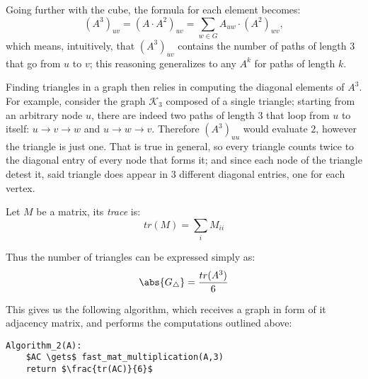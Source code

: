 Going further with the cube, the formula for each element becomes:
\[
    (A^3)_{uv} = \left( A \cdot A^2 \right)_{uv} = \sum_{w \in G} A_{uw} \cdot (A^2)_{wv},
\]
which means, intuitively, that $(A^3)_{uv}$ contains the number of paths of length $3$ that go from $u$ to $v$; this reasoning generalizes to any $A^k$ for paths of length $k$.

Finding triangles in a graph then relies in computing the diagonal elements of $A^3$. For example, consider the graph $\mathcal{K}_3$ composed of a single triangle; starting from an arbitrary node $u$, there are indeed two paths of length $3$ that loop from $u$ to itself: $u \to v \to w$ and $u \to w \to v$. Therefore $(A^3)_{uu}$ would evaluate $2$, however the triangle is just one. That is true in general, so every triangle counts twice to the diagonal entry of every node that forms it; and since each node of the triangle detest it, said triangle does appear in $3$ different diagonal entries, one for each vertex.

\begin{definition}
    Let $M$ be a matrix, its \emph{trace} is:
    \begin{equation}\label{eq:trace}
        tr(M) = \sum_i M_{ii}
    \end{equation}
\end{definition}

Thus the number of triangles can be expressed simply as:
\begin{equation} \label{eq:triangles-1}
	\abs{G_\triangle} = \frac{tr(A^3)}{6}
\end{equation}

This gives us the following algorithm, which receives a graph in form of it adjacency matrix, and performs the computations outlined above:
\begin{lstlisting}[caption = {Algorithm 2}, label = {lst:triangles-alg2}]
Algorithm_2(A):
    $AC \gets$ fast_mat_multiplication(A,3)
    return $\frac{tr(AC)}{6}$
\end{lstlisting}

